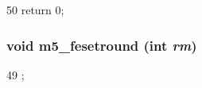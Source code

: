 \begin{DoxyCode}
50 {return 0; }
\end{DoxyCode}
\hypertarget{fenv_8hh_a60d890aa65281f81b2b9e7c7583dde08}{
\subsubsection[{m5\_\-fesetround}]{\setlength{\rightskip}{0pt plus 5cm}void m5\_\-fesetround (int {\em rm})}}
\label{fenv_8hh_a60d890aa65281f81b2b9e7c7583dde08}



\begin{DoxyCode}
49 { ; }
\end{DoxyCode}
